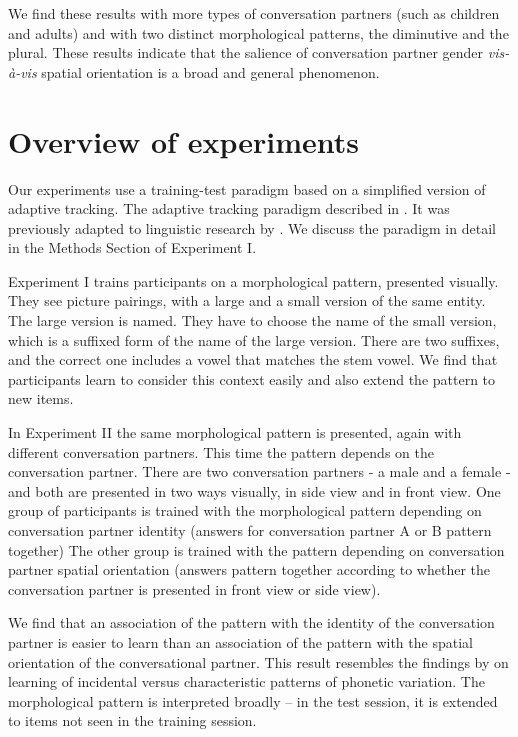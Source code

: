 \documentclass{frontiersSCNS} %
\begin{document}
We find these results with more types of conversation partners (such as children and adults) and with two distinct morphological patterns, the diminutive and the plural. These results indicate that the salience of conversation partner gender \emph{vis-\`a-vis} spatial orientation is a broad and general phenomenon.

\section{Overview of experiments}

Our experiments use a training-test paradigm based on a simplified version of adaptive tracking.
The adaptive tracking paradigm described in \cite{leek2001adaptive}. It was previously adapted to linguistic research
by \cite{schumacher2014}. We discuss the paradigm in detail in the Methods Section of Experiment I.

Experiment I trains participants on a morphological pattern, presented visually. They see picture pairings, with a large and a small version of the same entity. The large version is named. They have to choose the name of the small version, which is a suffixed form of the name of the large version. There are two suffixes, and the correct one includes a vowel that matches the stem vowel. We find that participants learn to consider this context easily and also extend the pattern to new items. 

In Experiment II the same morphological pattern is presented, again with different conversation partners. This time the pattern depends on the conversation partner. There are two conversation partners - a male and a female - and both are presented in two ways visually, in side view and in front view. One group of participants is trained with the morphological pattern depending on conversation partner identity (answers for conversation partner A or B pattern together) The other group is trained with the pattern depending on conversation partner spatial orientation (answers pattern together according to whether the conversation partner is presented in front view or side view).

We find that  an association of the pattern with the  identity of the conversation partner is easier to learn than an association of the pattern
with the spatial orientation of the conversational partner.  This result resembles the findings by \cite {kraljic2008} on learning of incidental versus characteristic patterns of phonetic variation.  The morphological pattern is interpreted broadly -- in the test session, it is extended to items not seen in the training session.
\end{document}
